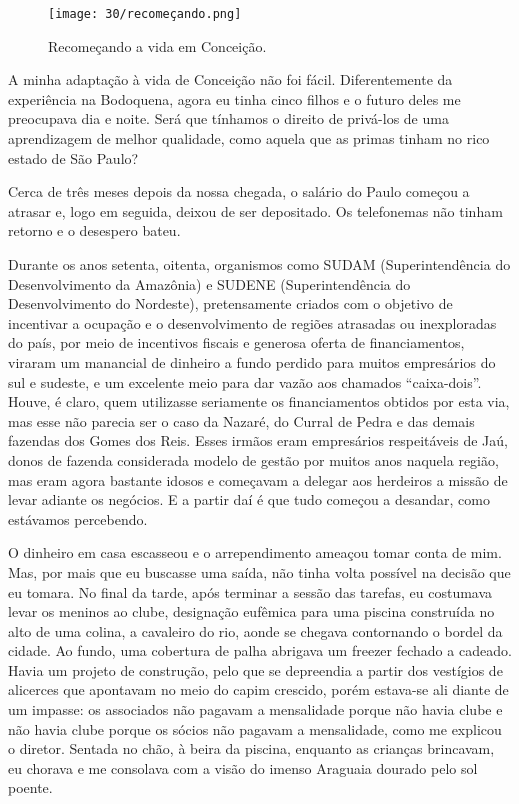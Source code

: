 \begin{figure}
\centering
\texttt{[image: 30/recomeçando.png]}
\caption{Recomeçando a vida em Conceição.}
\end{figure}

A minha adaptação à vida de Conceição não foi fácil.
Diferentemente da experiência na Bodoquena, agora eu tinha cinco filhos e o futuro deles me preocupava dia e noite.
Será que tínhamos o direito de privá-los de uma aprendizagem de melhor qualidade, como aquela que as primas tinham no rico estado de São Paulo?  

Cerca de três meses depois da nossa chegada, o salário do Paulo começou a atrasar e, logo em seguida, deixou de ser depositado.
Os telefonemas não tinham retorno e o desespero bateu.

Durante os anos setenta, oitenta, organismos como SUDAM (Superintendência do Desenvolvimento da Amazônia) e SUDENE (Superintendência do Desenvolvimento do Nordeste), pretensamente criados com o objetivo de incentivar a ocupação e o desenvolvimento de regiões atrasadas ou inexploradas do país, por meio de incentivos fiscais e generosa oferta de financiamentos, viraram um manancial de dinheiro a fundo perdido para muitos empresários do sul e sudeste, e um excelente meio para dar vazão aos chamados ``caixa-dois''.
Houve, é claro, quem utilizasse seriamente os financiamentos obtidos por esta via, mas esse não parecia ser o caso da Nazaré, do Curral de Pedra e das demais fazendas dos Gomes dos Reis.
Esses irmãos eram empresários respeitáveis de Jaú, donos de fazenda considerada modelo de gestão por muitos anos naquela região, mas eram agora bastante idosos e começavam a delegar aos herdeiros a missão de levar adiante os negócios.
E a partir daí é que tudo começou a desandar, como estávamos percebendo.

O dinheiro em casa escasseou e o arrependimento ameaçou tomar conta de mim.
Mas, por mais que eu buscasse uma saída, não tinha volta possível na decisão que eu tomara.
No final da tarde, após terminar a sessão das tarefas, eu costumava levar os meninos ao clube, designação eufêmica para uma piscina construída no alto de uma colina, a cavaleiro do rio, aonde se chegava contornando o bordel da cidade.
Ao fundo, uma cobertura de palha abrigava um freezer fechado a cadeado.
Havia um projeto de construção, pelo que se depreendia a partir dos vestígios de alicerces que apontavam no meio do capim crescido, porém estava-se ali diante de um impasse: os associados não pagavam a mensalidade porque não havia clube e não havia clube porque os sócios não pagavam a mensalidade, como me explicou o diretor.
Sentada no chão, à beira da piscina, enquanto as crianças brincavam, eu chorava e me consolava com a visão do imenso Araguaia dourado pelo sol poente.


